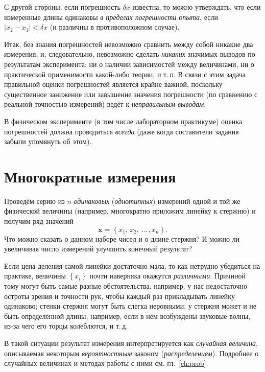 С другой стороны, если погрешность $\delta x$ известна, то можно
утверждать, что если измеренные длины одинаковы
\emph{в пределах погрешности опыта}, если $|x_{2}-x_{1}|<\delta x$
(и различны в противоположном случае).

Итак, без знания погрешностей невозможно сравнить между собой никакие
два измерения, и, следовательно, невозможно сделать \emph{никаких}
значимых выводов по результатам эксперимента: ни о наличии зависимостей
между величинами, ни о практической применимости какой-либо теории,
и т.\,п. В связи с этим задача правильной оценки погрешностей является крайне
важной, поскольку существенное занижение или завышение значения погрешности
(по сравнению с реальной точностью измерений) ведёт к \emph{неправильным выводам}.

В физическом эксперименте (в том числе лабораторном практикуме) оценка
погрешностей должна проводиться \emph{всегда}
(даже когда составители задания забыли упомянуть об этом).

\section{Многократные измерения}

Проведём серию из $n$ \emph{одинаковых} (\emph{однотипных}) измерений одной
и той же физической величины (например, многократно приложим линейку к стержню) и получим
ряд значений
\[
\mathbf{x} = \left\{ x_{1},\,x_{2},\,\ldots\,,x_{n}\right\} .
\]
Что можно сказать о данном наборе чисел и о длине стержня?
И можно ли увеличивая число измерений улучшить конечный результат?

Если цена деления самой линейки достаточно мала, то как нетрудно убедиться
на практике, величины $\left\{ x_{i}\right\}$ почти наверняка окажутся
\emph{различными}. Причиной тому могут быть
самые разные обстоятельства, например: у нас недостаточно остроты
зрения и точности рук, чтобы каждый раз прикладывать линейку одинаково;
стенки стержня могут быть слегка неровными; у стержня может и не быть
определённой длины, например, если в нём возбуждены звуковые волны,
из-за чего его торцы колеблются, и т.\,д.

В такой ситуации результат измерения интерпретируется как
\emph{случайная величина}, описываемая некоторым \emph{вероятностным} законом
(\emph{распределением}).
Подробнее о случайных величинах и методах работы с ними см. гл.~\ref{ch:prob}.


